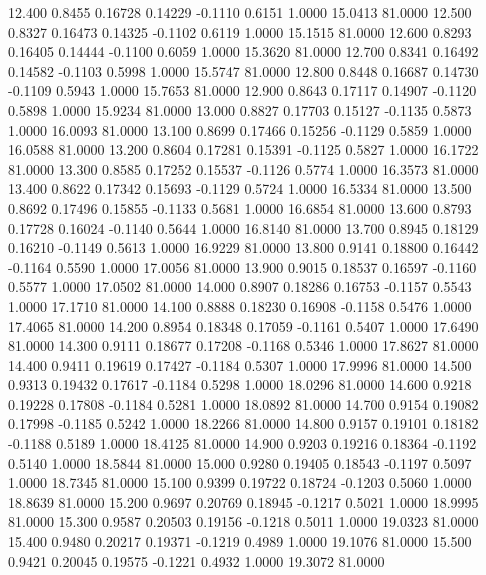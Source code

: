   12.400   0.8455   0.16728   0.14229  -0.1110   0.6151   1.0000  15.0413  81.0000
  12.500   0.8327   0.16473   0.14325  -0.1102   0.6119   1.0000  15.1515  81.0000
  12.600   0.8293   0.16405   0.14444  -0.1100   0.6059   1.0000  15.3620  81.0000
  12.700   0.8341   0.16492   0.14582  -0.1103   0.5998   1.0000  15.5747  81.0000
  12.800   0.8448   0.16687   0.14730  -0.1109   0.5943   1.0000  15.7653  81.0000
  12.900   0.8643   0.17117   0.14907  -0.1120   0.5898   1.0000  15.9234  81.0000
  13.000   0.8827   0.17703   0.15127  -0.1135   0.5873   1.0000  16.0093  81.0000
  13.100   0.8699   0.17466   0.15256  -0.1129   0.5859   1.0000  16.0588  81.0000
  13.200   0.8604   0.17281   0.15391  -0.1125   0.5827   1.0000  16.1722  81.0000
  13.300   0.8585   0.17252   0.15537  -0.1126   0.5774   1.0000  16.3573  81.0000
  13.400   0.8622   0.17342   0.15693  -0.1129   0.5724   1.0000  16.5334  81.0000
  13.500   0.8692   0.17496   0.15855  -0.1133   0.5681   1.0000  16.6854  81.0000
  13.600   0.8793   0.17728   0.16024  -0.1140   0.5644   1.0000  16.8140  81.0000
  13.700   0.8945   0.18129   0.16210  -0.1149   0.5613   1.0000  16.9229  81.0000
  13.800   0.9141   0.18800   0.16442  -0.1164   0.5590   1.0000  17.0056  81.0000
  13.900   0.9015   0.18537   0.16597  -0.1160   0.5577   1.0000  17.0502  81.0000
  14.000   0.8907   0.18286   0.16753  -0.1157   0.5543   1.0000  17.1710  81.0000
  14.100   0.8888   0.18230   0.16908  -0.1158   0.5476   1.0000  17.4065  81.0000
  14.200   0.8954   0.18348   0.17059  -0.1161   0.5407   1.0000  17.6490  81.0000
  14.300   0.9111   0.18677   0.17208  -0.1168   0.5346   1.0000  17.8627  81.0000
  14.400   0.9411   0.19619   0.17427  -0.1184   0.5307   1.0000  17.9996  81.0000
  14.500   0.9313   0.19432   0.17617  -0.1184   0.5298   1.0000  18.0296  81.0000
  14.600   0.9218   0.19228   0.17808  -0.1184   0.5281   1.0000  18.0892  81.0000
  14.700   0.9154   0.19082   0.17998  -0.1185   0.5242   1.0000  18.2266  81.0000
  14.800   0.9157   0.19101   0.18182  -0.1188   0.5189   1.0000  18.4125  81.0000
  14.900   0.9203   0.19216   0.18364  -0.1192   0.5140   1.0000  18.5844  81.0000
  15.000   0.9280   0.19405   0.18543  -0.1197   0.5097   1.0000  18.7345  81.0000
  15.100   0.9399   0.19722   0.18724  -0.1203   0.5060   1.0000  18.8639  81.0000
  15.200   0.9697   0.20769   0.18945  -0.1217   0.5021   1.0000  18.9995  81.0000
  15.300   0.9587   0.20503   0.19156  -0.1218   0.5011   1.0000  19.0323  81.0000
  15.400   0.9480   0.20217   0.19371  -0.1219   0.4989   1.0000  19.1076  81.0000
  15.500   0.9421   0.20045   0.19575  -0.1221   0.4932   1.0000  19.3072  81.0000
